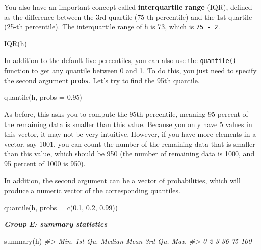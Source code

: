 \documentclass[
]{book}
\newenvironment{Shaded}{\begin{snugshade}}{\end{snugshade}}
\newcommand{\AttributeTok}[1]{\textcolor[rgb]{0.77,0.63,0.00}{#1}}
\newcommand{\CommentTok}[1]{\textcolor[rgb]{0.56,0.35,0.01}{\textit{#1}}}
\newcommand{\FloatTok}[1]{\textcolor[rgb]{0.00,0.00,0.81}{#1}}
\newcommand{\FunctionTok}[1]{\textcolor[rgb]{0.00,0.00,0.00}{#1}}
\newcommand{\NormalTok}[1]{#1}
\begin{document}
You also have an important concept called \textbf{interquartile range} (IQR), defined as the difference between the 3rd quartile (75-th percentile) and the 1st quartile (25-th percentile). The interquartile range of \texttt{h} is 73, which is \texttt{75\ -\ 2}.

\begin{Shaded}
\begin{Highlighting}[]
\FunctionTok{IQR}\NormalTok{(h)}
\end{Highlighting}
\end{Shaded}

In addition to the default five percentiles, you can also use the \texttt{quantile()} function to get any quantile between 0 and 1. To do this, you just need to specify the second argument \texttt{probs}. Let's try to find the 95th quantile.

\begin{Shaded}
\begin{Highlighting}[]
\FunctionTok{quantile}\NormalTok{(h, }\AttributeTok{probs =} \FloatTok{0.95}\NormalTok{)}
\end{Highlighting}
\end{Shaded}

As before, this asks you to compute the 95th percentile, meaning 95 percent of the remaining data is smaller than this value. Because you only have 5 values in this vector, it may not be very intuitive. However, if you have more elements in a vector, say 1001, you can count the number of the remaining data that is smaller than this value, which should be 950 (the number of remaining data is 1000, and 95 percent of 1000 is 950).

In addition, the second argument can be a vector of probabilities, which will produce a numeric vector of the corresponding quantiles.

\begin{Shaded}
\begin{Highlighting}[]
\FunctionTok{quantile}\NormalTok{(h, }\AttributeTok{probs =} \FunctionTok{c}\NormalTok{(}\FloatTok{0.1}\NormalTok{, }\FloatTok{0.2}\NormalTok{, }\FloatTok{0.99}\NormalTok{))}
\end{Highlighting}
\end{Shaded}

\textbf{\emph{Group E: summary statistics}}

\begin{Shaded}
\begin{Highlighting}[]
\FunctionTok{summary}\NormalTok{(h)}
\CommentTok{\#\textgreater{}    Min. 1st Qu.  Median    Mean 3rd Qu.    Max. }
\CommentTok{\#\textgreater{}       0       2       3      36      75     100}
\end{Highlighting}
\end{Shaded}
\end{document}
